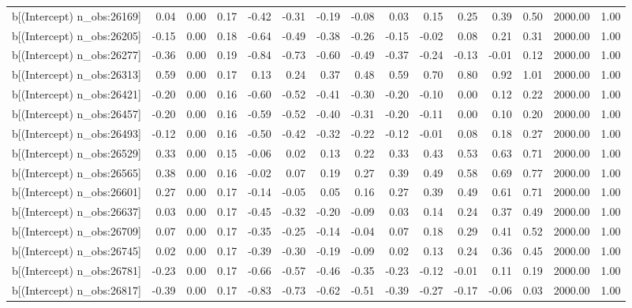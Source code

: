 \begin{table}[ht]
\begin{tabular}{rrrrrrrrrrrrrrr}
  b[(Intercept) n\_obs:26169] & 0.04 & 0.00 & 0.17 & -0.42 & -0.31 & -0.19 & -0.08 & 0.03 & 0.15 & 0.25 & 0.39 & 0.50 & 2000.00 & 1.00 \\ 
  b[(Intercept) n\_obs:26205] & -0.15 & 0.00 & 0.18 & -0.64 & -0.49 & -0.38 & -0.26 & -0.15 & -0.02 & 0.08 & 0.21 & 0.31 & 2000.00 & 1.00 \\ 
  b[(Intercept) n\_obs:26277] & -0.36 & 0.00 & 0.19 & -0.84 & -0.73 & -0.60 & -0.49 & -0.37 & -0.24 & -0.13 & -0.01 & 0.12 & 2000.00 & 1.00 \\ 
  b[(Intercept) n\_obs:26313] & 0.59 & 0.00 & 0.17 & 0.13 & 0.24 & 0.37 & 0.48 & 0.59 & 0.70 & 0.80 & 0.92 & 1.01 & 2000.00 & 1.00 \\ 
  b[(Intercept) n\_obs:26421] & -0.20 & 0.00 & 0.16 & -0.60 & -0.52 & -0.41 & -0.30 & -0.20 & -0.10 & 0.00 & 0.12 & 0.22 & 2000.00 & 1.00 \\ 
  b[(Intercept) n\_obs:26457] & -0.20 & 0.00 & 0.16 & -0.59 & -0.52 & -0.40 & -0.31 & -0.20 & -0.11 & 0.00 & 0.10 & 0.20 & 2000.00 & 1.00 \\ 
  b[(Intercept) n\_obs:26493] & -0.12 & 0.00 & 0.16 & -0.50 & -0.42 & -0.32 & -0.22 & -0.12 & -0.01 & 0.08 & 0.18 & 0.27 & 2000.00 & 1.00 \\ 
  b[(Intercept) n\_obs:26529] & 0.33 & 0.00 & 0.15 & -0.06 & 0.02 & 0.13 & 0.22 & 0.33 & 0.43 & 0.53 & 0.63 & 0.71 & 2000.00 & 1.00 \\ 
  b[(Intercept) n\_obs:26565] & 0.38 & 0.00 & 0.16 & -0.02 & 0.07 & 0.19 & 0.27 & 0.39 & 0.49 & 0.58 & 0.69 & 0.77 & 2000.00 & 1.00 \\ 
  b[(Intercept) n\_obs:26601] & 0.27 & 0.00 & 0.17 & -0.14 & -0.05 & 0.05 & 0.16 & 0.27 & 0.39 & 0.49 & 0.61 & 0.71 & 2000.00 & 1.00 \\ 
  b[(Intercept) n\_obs:26637] & 0.03 & 0.00 & 0.17 & -0.45 & -0.32 & -0.20 & -0.09 & 0.03 & 0.14 & 0.24 & 0.37 & 0.49 & 2000.00 & 1.00 \\ 
  b[(Intercept) n\_obs:26709] & 0.07 & 0.00 & 0.17 & -0.35 & -0.25 & -0.14 & -0.04 & 0.07 & 0.18 & 0.29 & 0.41 & 0.52 & 2000.00 & 1.00 \\ 
  b[(Intercept) n\_obs:26745] & 0.02 & 0.00 & 0.17 & -0.39 & -0.30 & -0.19 & -0.09 & 0.02 & 0.13 & 0.24 & 0.36 & 0.45 & 2000.00 & 1.00 \\ 
  b[(Intercept) n\_obs:26781] & -0.23 & 0.00 & 0.17 & -0.66 & -0.57 & -0.46 & -0.35 & -0.23 & -0.12 & -0.01 & 0.11 & 0.19 & 2000.00 & 1.00 \\ 
  b[(Intercept) n\_obs:26817] & -0.39 & 0.00 & 0.17 & -0.83 & -0.73 & -0.62 & -0.51 & -0.39 & -0.27 & -0.17 & -0.06 & 0.03 & 2000.00 & 1.00 \\ 

\end{tabular}
\end{table}
